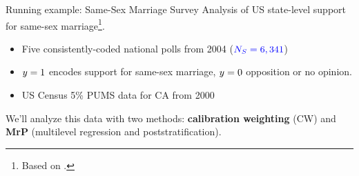 





\begin{frame}[t]{Running example: Same-Sex Marriage Survey}
Analysis of US state-level support for same-sex marriage\footnote{
    Based on \textcite{lax:2009:gay,kastellec:2010:laxmrp}.}.

\begin{itemize}
    \item {} Five consistently-coded national polls from 2004 
        ($\textcolor{blue}{{\textcolor{blue}{N_S}} ={}6,341}$)
    \item {}  $y = 1$ encodes support for same-sex marriage, $y = 0$ opposition
       or no opinion.
    \item {} US Census 5\% PUMS data for CA from 2000
\end{itemize}

\pause
We'll analyze this data with two methods: \textbf{calibration weighting} (CW) and \textbf{MrP}
(multilevel regression and poststratification).
%
\end{frame}




